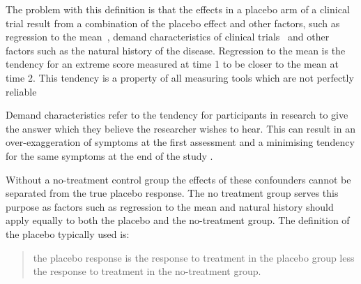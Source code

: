 The problem with this definition is that the effects in a placebo arm of a clinical trial result from a combination of the placebo effect and other factors, such as regression to the mean~\cite{Morton2003}, demand characteristics of clinical trials~\cite{hrobjartsson2001,weber1972subject} and other factors such as the natural history of the disease. Regression to the mean is the tendency for an extreme score measured at time 1 to be closer to the mean at time 2. This tendency is a property of all measuring tools which are not perfectly reliable \cite{Morton2003}

Demand characteristics \cite{Fernandez1994,weber1972subject} refer to the tendency for participants in research to give the answer which they believe the researcher wishes to hear. This can result in an over-exaggeration of symptoms at the first assessment and a minimising tendency for the same symptoms at the end of the study \cite{Vase2005}.  






Without a no-treatment control group the effects of these confounders cannot be separated from the true placebo response.  The no treatment group serves this purpose as factors such as regression to the mean and natural history should apply equally to both the placebo and the no-treatment group.  The definition of the placebo typically used is:
\begin{quotation}
 the placebo response is the response to treatment in the placebo group less the response to treatment in the no-treatment group.  
\end{quotation}


